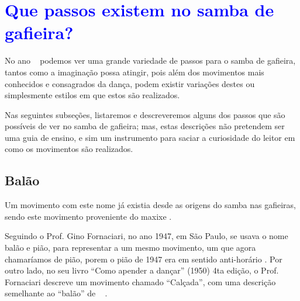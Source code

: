 
\section{\textcolor{blue}{Que passos existem no samba de gafieira?}}

No ano \AnoLivro~ podemos ver uma grande variedade de passos para o samba de gafieira,
tantos como a imaginação possa atingir, pois além dos movimentos mais conhecidos e  consagrados da dança,
podem existir variações  destes ou simplesmente estilos em que estos são realizados. 



Nas seguintes subseções, listaremos e descreveremos 
alguns dos passos que são possíveis de ver no samba de gafieira;
mas, estas descrições não pretendem ser uma guia de ensino,
e sim um instrumento para saciar a curiosidade do leitor em como os movimentos são realizados.\\

\subsection{Balão} 
\label{def:PassoBalao}
Um movimento com este nome já existia desde as origens do samba nas gafieiras, 
sendo este movimento proveniente do maxixe \cite[pp. 142]{perna2002samba} 
\cite[pp. 93]{efege1974maxixe} \cite[pp. 465]{marcondes1977enciclopedia}.



Seguindo o Prof. Gino Fornaciari, no ano 1947,  em São Paulo, se usava o nome balão e pião,
para representar a um mesmo movimento, um que agora chamaríamos de pião, 
porem o pião de 1947 era em sentido anti-horário \cite[pp. 68-72]{fornaciari1947aprender}.
Por outro lado, no seu livro ``Como apender a dançar'' (1950) 4ta edição,
o Prof. Fornaciari descreve um movimento  chamado ``Calçada'', com uma descrição semelhante 
ao ``balão'' de \AnoLivro~ \cite[pp. 162]{fornaciari1950aprender}.

